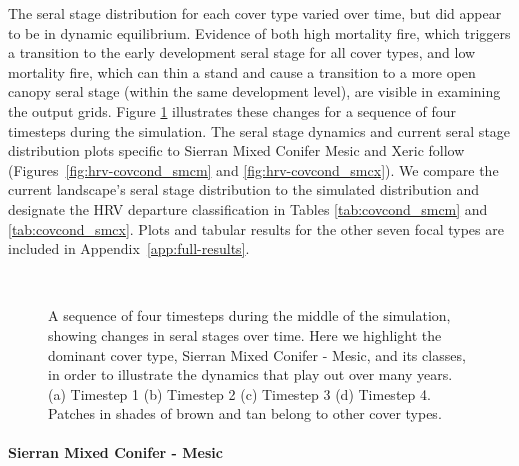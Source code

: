 The seral stage distribution for each cover type varied over time, but did appear to be in dynamic equilibrium. Evidence of both high mortality fire, which triggers a transition to the early development seral stage for all cover types, and low mortality fire, which can thin a stand and cause a transition to a more open canopy seral stage (within the same development level), are visible in examining the output grids. Figure \ref{fig:covcondmaps} illustrates these changes for a sequence of four timesteps during the simulation. The seral stage dynamics and current seral stage distribution plots specific to Sierran Mixed Conifer Mesic and Xeric follow (Figures~\ref{fig:hrv-covcond_smcm} and \ref{fig:hrv-covcond_smcx}). We compare the current landscape's seral stage distribution to the simulated distribution and designate the HRV departure classification in Tables \ref{tab:covcond_smcm} and \ref{tab:covcond_smcx}. Plots and tabular results for the other seven focal types are included in Appendix~\ref{app:full-results}.

\begin{figure}[!htbp]
  \centering
  \\%
  \caption{A sequence of four timesteps during the middle of the simulation, showing changes in seral stages over time. Here we highlight the dominant cover type, Sierran Mixed Conifer - Mesic, and its classes, in order to illustrate the dynamics that play out over many years. (a) Timestep 1 (b) Timestep 2 (c) Timestep 3 (d) Timestep 4. Patches in shades of brown and tan belong to other cover types.}
  \label{fig:covcondmaps}
\end{figure}


\clearpage

\paragraph{Sierran Mixed Conifer - Mesic}

